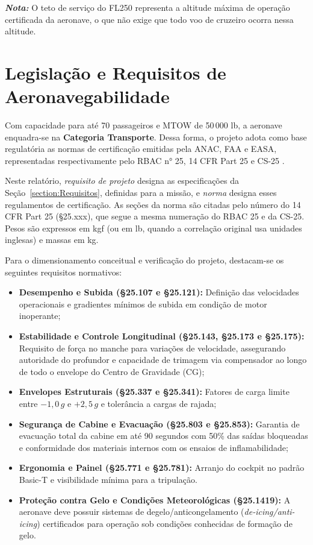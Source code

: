 \textbf{\textit{Nota:}} O teto de serviço do FL250 representa a altitude máxima de operação certificada da aeronave, o que não exige que todo voo de cruzeiro ocorra nessa altitude.

\section{Legislação e Requisitos de Aeronavegabilidade}

Com capacidade para até 70 passageiros e MTOW de 50\,000 lb, a aeronave enquadra-se na \textbf{Categoria Transporte}. Dessa forma, o projeto adota como base regulatória as normas de certificação emitidas pela ANAC, FAA e EASA, representadas respectivamente pelo RBAC n° 25, 14 CFR Part 25 e CS-25 \cite{rbac25, far25, cs25}.

Neste relatório, \emph{requisito de projeto} designa as especificações da Seção~\ref{section:Requisitos}, definidas para a missão, e \emph{norma} designa esses regulamentos de certificação. As seções da norma são citadas pelo número do 14 CFR Part 25 (\S 25.xxx), que segue a mesma numeração do RBAC 25 e da CS-25. Pesos são expressos em kgf (ou em lb, quando a correlação original usa unidades inglesas) e massas em kg.

Para o dimensionamento conceitual e verificação do projeto, destacam-se os seguintes requisitos normativos:

\begin{itemize}
    \item \textbf{Desempenho e Subida (\S 25.107 e \S 25.121):} Definição das velocidades operacionais e gradientes mínimos de subida em condição de motor inoperante;
    \item \textbf{Estabilidade e Controle Longitudinal (\S 25.143, \S 25.173 e \S 25.175):} Requisito de força no manche para variações de velocidade, assegurando autoridade do profundor e capacidade de trimagem via compensador ao longo de todo o envelope do Centro de Gravidade (CG);
    \item \textbf{Envelopes Estruturais (\S25.337 e \S25.341):} Fatores de carga limite entre $-1,0\,g$ e $+2,5\,g$ e tolerância a cargas de rajada;
    \item \textbf{Segurança de Cabine e Evacuação (\S25.803 e \S25.853):} Garantia de evacuação total da cabine em até 90 segundos com 50\% das saídas bloqueadas e conformidade dos materiais internos com os ensaios de inflamabilidade;
    \item \textbf{Ergonomia e Painel (\S25.771 e \S25.781):} Arranjo do cockpit no padrão Basic-T e visibilidade mínima para a tripulação.
    \item \textbf{Proteção contra Gelo e Condições Meteorológicas (\S25.1419):} A aeronave deve possuir sistemas de degelo/anticongelamento (\textit{de-icing/anti-icing}) certificados para operação sob condições conhecidas de formação de gelo.
\end{itemize}

